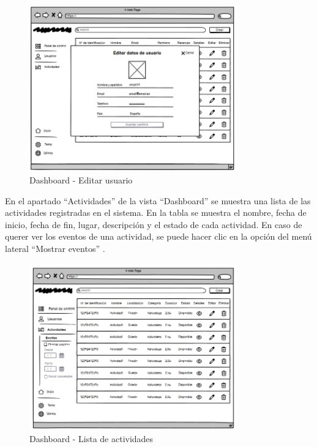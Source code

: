 \begin{figure}[H]
	\centering
	\includegraphics[width=0.8\textwidth]{5-AnalisisDelSistemaDeInformacion/InterfacesDeUsuario/Dashboard/lista usuarios edit.png}
	\caption{Dashboard - Editar usuario}
\end{figure}

En el apartado “Actividades” de la vista “Dashboard” se muestra una lista de las actividades registradas en el sistema.
En la tabla se muestra el nombre, fecha de inicio, fecha de fin, lugar, descripción y el estado de cada actividad.
En caso de querer ver los eventos de una actividad, se puede hacer clic en la opción del menú lateral “Mostrar eventos” .

\begin{figure}[H]
	\centering
	\includegraphics[width=0.8\textwidth]{5-AnalisisDelSistemaDeInformacion/InterfacesDeUsuario/Dashboard/lista de actividades.png}
	\caption{Dashboard - Lista de actividades}
\end{figure}

